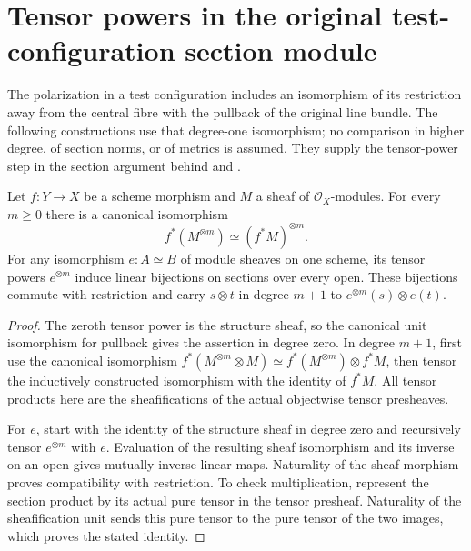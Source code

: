 \section{Tensor powers in the original test-configuration section module}

The polarization in a test configuration includes an isomorphism of its
restriction away from the central fibre with the pullback of the original
line bundle.  The following constructions use that degree-one isomorphism;
no comparison in higher degree, of section norms, or of metrics is assumed.
They supply the tensor-power step in the section argument behind
\cite[Lemma~5.22]{BJ22} and \cite[Proposition~2.5]{FHX}.

\begin{lemma}
\label{lem:tc-seven-canonical-power-transport}
Let $f:Y\to X$ be a scheme morphism and $M$ a sheaf of
$\mathcal O_X$-modules.  For every $m\geq0$ there is a canonical
isomorphism
\[
 f^*(M^{\otimes m})\simeq(f^*M)^{\otimes m}.
\]
For any isomorphism $e:A\simeq B$ of module sheaves on one scheme,
its tensor powers $e^{\otimes m}$ induce linear bijections on
sections over every open.  These bijections commute with restriction
and carry $s\otimes t$ in degree $m+1$ to
$e^{\otimes m}(s)\otimes e(t)$.
\leanok
\end{lemma}
\begin{proof}
The zeroth tensor power is the structure sheaf, so the canonical unit
isomorphism for pullback gives the assertion in degree zero.  In degree
$m+1$, first use the canonical isomorphism
$f^*(M^{\otimes m}\otimes M)\simeq
f^*(M^{\otimes m})\otimes f^*M$, then tensor the inductively
constructed isomorphism with the identity of $f^*M$.
All tensor products here are the sheafifications of the actual
objectwise tensor presheaves.

For $e$, start with the identity of the structure sheaf in degree zero
and recursively tensor $e^{\otimes m}$ with $e$.  Evaluation of the
resulting sheaf isomorphism and its inverse on an open gives mutually
inverse linear maps.  Naturality of the sheaf morphism proves
compatibility with restriction.  To check multiplication, represent
the section product by its actual pure tensor in the tensor
presheaf.  Naturality of the sheafification unit sends this pure
tensor to the pure tensor of the two images, which proves the stated
identity.
\end{proof}

